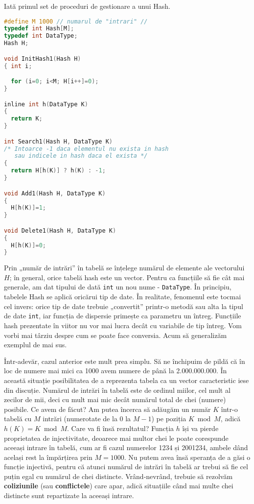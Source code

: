 Iată primul set de proceduri de gestionare a unui Hash.

\begin{lstlisting}[language=C]
#define M 1000 // numarul de "intrari" //
typedef int Hash[M];
typedef int DataType;
Hash H;

void InitHash1(Hash H)
{ int i;

  for (i=0; i<M; H[i++]=0);
}

inline int h(DataType K)
{
  return K;
}

int Search1(Hash H, DataType K)
/* Intoarce -1 daca elementul nu exista in hash
   sau indicele in hash daca el exista */
{
  return H[h(K)] ? h(K) : -1;
}

void Add1(Hash H, DataType K)
{
  H[h(K)]=1;
}

void Delete1(Hash H, DataType K)
{
  H[h(K)]=0;
}
\end{lstlisting}

Prin „număr de intrări” în tabelă se înțelege numărul de elemente ale
vectorului $H$; în general, orice tabelă hash este un vector. Pentru ca
funcțiile să fie cât mai generale, am dat tipului de dată {\tt int} un nou
nume - {\tt DataType}. În principiu, tabelele Hash se aplică oricărui tip de
date. În realitate, fenomenul este tocmai cel invers: orice tip de date
trebuie „convertit” printr-o metodă sau alta la tipul de date {\tt int}, iar
funcția de dispersie primește ca parametru un întreg. Funcțiile hash
prezentate în viitor nu vor mai lucra decât cu variabile de tip întreg. Vom
vorbi mai târziu despre cum se poate face conversia. Acum să generalizăm
exemplul de mai sus.

Într-adevăr, cazul anterior este mult prea simplu. Să ne închipuim de pildă că
în loc de numere mai mici ca 1000 avem numere de până la 2.000.000.000. În
această situație posibilitatea de a reprezenta tabela ca un vector
caracteristic iese din discuție. Numărul de intrări în tabelă este de ordinul
miilor, cel mult al zecilor de mii, deci cu mult mai mic decât numărul total
de chei (numere) posibile. Ce avem de făcut? Am putea încerca să adăugăm un
număr $K$ într-o tabelă cu $M$ intrări (numerotate de la 0 la $M-1$) pe
poziția $K \bmod M$, adică $h(K)=K \bmod M$. Care va fi însă rezultatul?
Funcția $h$ își va pierde proprietatea de injectivitate, deoarece mai multor
chei le poate corespunde aceeași intrare în tabelă, cum ar fi cazul numerelor
1234 și 2001234, ambele dând același rest la împărțirea prin $M=1000$. Nu
putem avea însă speranța de a găsi o funcție injectivă, pentru că atunci
numărul de intrări în tabelă ar trebui să fie cel puțin egal cu numărul de
chei distincte. Vrând-nevrând, trebuie să rezolvăm {\bf coliziunile} (sau {\bf
  conflictele}) care apar, adică situațiile când mai multe chei distincte sunt
repartizate la aceeași intrare.

